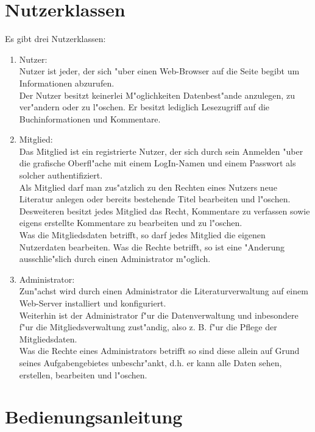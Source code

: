 \section{Nutzerklassen}
Es gibt drei Nutzerklassen:
\begin{enumerate}
\item Nutzer:\\
Nutzer ist jeder, der sich "uber einen Web-Browser auf die Seite begibt um Informationen abzurufen.\\
Der Nutzer besitzt keinerlei M"oglichkeiten Datenbest"ande anzulegen, zu ver"andern oder zu l"oschen. Er besitzt lediglich Lesezugriff auf die Buchinformationen und Kommentare. \\

\item Mitglied:\\
Das Mitglied ist ein registrierte Nutzer, der sich durch sein Anmelden "uber die grafische Oberfl"ache mit einem LogIn-Namen und einem Passwort als solcher authentifiziert.\\
Als Mitglied darf man zus"atzlich zu den Rechten eines Nutzers neue Literatur anlegen oder bereits bestehende Titel bearbeiten und l"oschen.\\
Desweiteren besitzt jedes Mitglied das Recht, Kommentare zu verfassen sowie eigens erstellte Kommentare zu bearbeiten und zu l"oschen.\\
Was die Mitgliedsdaten betrifft, so darf jedes Mitglied die eigenen Nutzerdaten bearbeiten. Was die Rechte betrifft, so ist eine "Anderung ausschlie"slich durch einen Administrator m"oglich.\\

\item Administrator:\\
Zun"achst wird durch einen Administrator die Literaturverwaltung auf einem Web-Server installiert und konfiguriert.\\
Weiterhin ist der Administrator f"ur die Datenverwaltung und inbesondere f"ur die Mitgliedsverwaltung zust"andig, also z. B. f"ur die Pflege der Mitgliedsdaten.\\
Was die Rechte eines Administrators betrifft so sind diese allein auf Grund seines Aufgabengebietes unbeschr"ankt, d.h. er kann alle Daten sehen, erstellen, bearbeiten und l"oschen.\\ 

\end{enumerate}
\section{Bedienungsanleitung}
